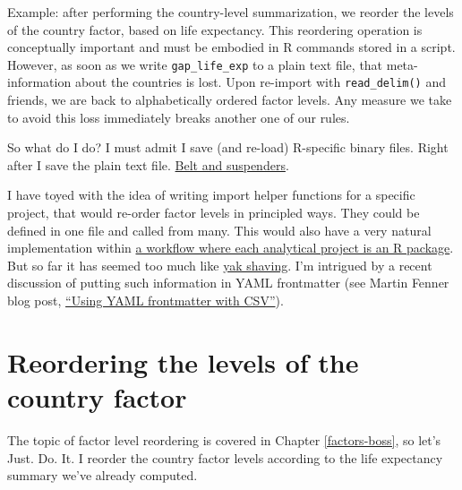 \documentclass[
]{book}
\begin{document}
Example: after performing the country-level summarization, we reorder the levels of the country factor, based on life expectancy. This reordering operation is conceptually important and must be embodied in R commands stored in a script. However, as soon as we write \texttt{gap\_life\_exp} to a plain text file, that meta-information about the countries is lost. Upon re-import with \texttt{read\_delim()} and friends, we are back to alphabetically ordered factor levels. Any measure we take to avoid this loss immediately breaks another one of our rules.

So what do I do? I must admit I save (and re-load) R-specific binary files. Right after I save the plain text file. \href{https://www.wisegeek.com/what-does-it-mean-to-wear-belt-and-suspenders.htm}{Belt and suspenders}.

I have toyed with the idea of writing import helper functions for a specific project, that would re-order factor levels in principled ways. They could be defined in one file and called from many. This would also have a very natural implementation within \href{https://www.carlboettiger.info/2012/05/06/research-workflow.html}{a workflow where each analytical project is an R package}. But so far it has seemed too much like \href{https://seths.blog/2005/03/dont_shave_that/}{yak shaving}. I'm intrigued by a recent discussion of putting such information in YAML frontmatter (see Martin Fenner blog post, \href{https://blog.datacite.org/using-yaml-frontmatter-with-csv/}{``Using YAML frontmatter with CSV''}).

\hypertarget{reordering-the-levels-of-the-country-factor}{%
\section{Reordering the levels of the country factor}\label{reordering-the-levels-of-the-country-factor}}

The topic of factor level reordering is covered in Chapter \ref{factors-boss}, so let's Just. Do. It. I reorder the country factor levels according to the life expectancy summary we've already computed.
\end{document}
